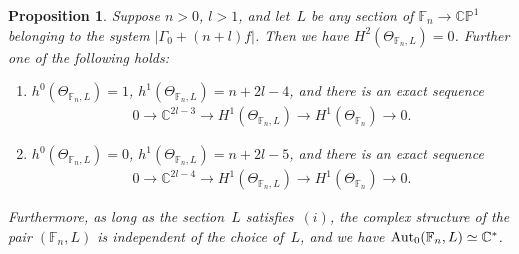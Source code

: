 \documentclass[pdftex]{sigma}
\numberwithin{equation}{section}
\newtheorem{Proposition}[Theorem]{Proposition}
{\theoremstyle{definition}
\newtheorem{Definition}[Theorem]{Definition}
\newtheorem{Remark}[Theorem]{Remark}
}
\begin{document}
\begin{Proposition}\label{prop:l2}
Suppose $n>0$, $l>1$, and let~$L$ be any section of $\mathbb{F}_n\to \mathbb{CP}^1$ belonging to the system $|\Gamma_0+(n+l)f|$.
Then we have $H^2(\Theta_{\mathbb{F}_n,L})=0$.
Further one of the following holds:
\begin{enumerate}\itemsep=0pt
\item[$(i)$] $h^0(\Theta_{\mathbb{F}_n, L}) = 1$, $h^1(\Theta_{\mathbb{F}_n, L}) = n+2l-4$, and there is an exact
sequence
\begin{gather*}
0
\longrightarrow
\mathbb{C}^{2l-3}
\longrightarrow
H^1(\Theta_{\mathbb{F}_n,L})
\longrightarrow
H^1(\Theta_{\mathbb{F}_n})
\longrightarrow
0.
\end{gather*}
\item[$(ii)$] $h^0(\Theta_{\mathbb{F}_n, L}) = 0$, $h^1(\Theta_{\mathbb{F}_n, L}) = n+2l-5$, and there is an exact
sequence
\begin{gather*}
0
\longrightarrow
\mathbb{C}^{2l-4}
\longrightarrow
H^1(\Theta_{\mathbb{F}_n,L})
\longrightarrow
H^1(\Theta_{\mathbb{F}_n})
\longrightarrow
0.
\end{gather*}
\end{enumerate}
Furthermore, as long as the section~$L$ satisfies~$(i)$, the complex structure of the pair $(\mathbb{F}_n,L)$ is
independent of the choice of~$L$, and we have ${\rm{Aut}}_0(\mathbb{F}_n, L) \simeq \mathbb{C}^*$.
\end{Proposition}
\end{document}
